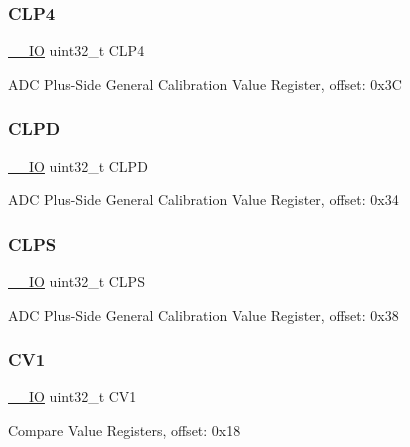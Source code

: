 \subsubsection{\texorpdfstring{CLP4}{CLP4}}
{\footnotesize\ttfamily \mbox{\hyperlink{core__cm0plus_8h_aec43007d9998a0a0e01faede4133d6be}{\+\_\+\+\_\+\+IO}} uint32\+\_\+t C\+L\+P4}

A\+DC Plus-\/\+Side General Calibration Value Register, offset\+: 0x3C \mbox{\label{struct_a_d_c___type_a1ac68ed297fff3a0b27ccd90a55b2f28}} 
\subsubsection{\texorpdfstring{CLPD}{CLPD}}
{\footnotesize\ttfamily \mbox{\hyperlink{core__cm0plus_8h_aec43007d9998a0a0e01faede4133d6be}{\+\_\+\+\_\+\+IO}} uint32\+\_\+t C\+L\+PD}

A\+DC Plus-\/\+Side General Calibration Value Register, offset\+: 0x34 \mbox{\label{struct_a_d_c___type_ae959a34b13cf9ea0076fda72fcf4cf70}} 
\subsubsection{\texorpdfstring{CLPS}{CLPS}}
{\footnotesize\ttfamily \mbox{\hyperlink{core__cm0plus_8h_aec43007d9998a0a0e01faede4133d6be}{\+\_\+\+\_\+\+IO}} uint32\+\_\+t C\+L\+PS}

A\+DC Plus-\/\+Side General Calibration Value Register, offset\+: 0x38 \mbox{\label{struct_a_d_c___type_ab69f073a5103823855dfa98e8b75ec9c}} 
\subsubsection{\texorpdfstring{CV1}{CV1}}
{\footnotesize\ttfamily \mbox{\hyperlink{core__cm0plus_8h_aec43007d9998a0a0e01faede4133d6be}{\+\_\+\+\_\+\+IO}} uint32\+\_\+t C\+V1}

Compare Value Registers, offset\+: 0x18 \mbox{\label{struct_a_d_c___type_aa6d0c2c2ba809736fd08737b76334280}} 
